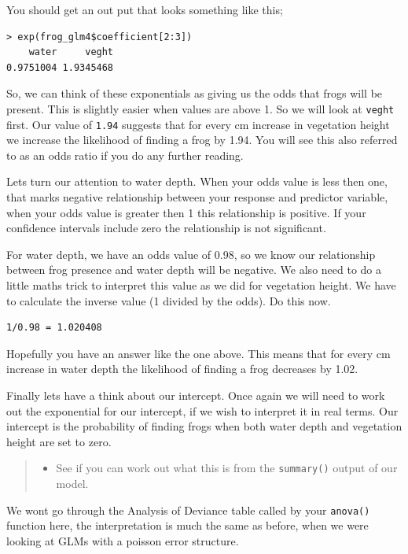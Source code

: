 \documentclass[
]{book}
\providecommand{\tightlist}{%
  \setlength{\itemsep}{0pt}\setlength{\parskip}{0pt}}
\begin{document}
You should get an out put that looks something like this;

\begin{verbatim}
> exp(frog_glm4$coefficient[2:3])
    water     veght 
0.9751004 1.9345468 
\end{verbatim}

So, we can think of these exponentials as giving us the odds that frogs will be present. This is slightly easier when values are above 1. So we will look at \texttt{veght} first. Our value of \texttt{1.94} suggests that for every cm increase in vegetation height we increase the likelihood of finding a frog by 1.94. You will see this also referred to as an odds ratio if you do any further reading.

Lets turn our attention to water depth. When your odds value is less then one, that marks negative relationship between your response and predictor variable, when your odds value is greater then 1 this relationship is positive. If your confidence intervals include zero the relationship is not significant.

For water depth, we have an odds value of 0.98, so we know our relationship between frog presence and water depth will be negative. We also need to do a little maths trick to interpret this value as we did for vegetation height. We have to calculate the inverse value (1 divided by the odds). Do this now.

\begin{verbatim}
1/0.98 = 1.020408
\end{verbatim}

Hopefully you have an answer like the one above. This means that for every cm increase in water depth the likelihood of finding a frog decreases by 1.02.

Finally lets have a think about our intercept. Once again we will need to work out the exponential for our intercept, if we wish to interpret it in real terms. Our intercept is the probability of finding frogs when both water depth and vegetation height are set to zero.

\begin{quote}
\begin{itemize}
\tightlist
\item
  See if you can work out what this is from the \texttt{summary()} output of our model.
\end{itemize}
\end{quote}

We wont go through the Analysis of Deviance table called by your \texttt{anova()} function here, the interpretation is much the same as before, when we were looking at GLMs with a poisson error structure.
\end{document}
